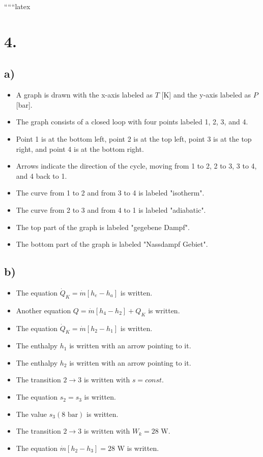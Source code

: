 
``````latex


\section*{4.}

\subsection*{a)}

\begin{itemize}
    \item A graph is drawn with the x-axis labeled as $T$ [K] and the y-axis labeled as $P$ [bar].
    \item The graph consists of a closed loop with four points labeled 1, 2, 3, and 4.
    \item Point 1 is at the bottom left, point 2 is at the top left, point 3 is at the top right, and point 4 is at the bottom right.
    \item Arrows indicate the direction of the cycle, moving from 1 to 2, 2 to 3, 3 to 4, and 4 back to 1.
    \item The curve from 1 to 2 and from 3 to 4 is labeled "isotherm".
    \item The curve from 2 to 3 and from 4 to 1 is labeled "adiabatic".
    \item The top part of the graph is labeled "gegebene Dampf".
    \item The bottom part of the graph is labeled "Nassdampf Gebiet".
\end{itemize}

\subsection*{b)}

\begin{itemize}
    \item The equation $\dot{Q}_K = \dot{m} \left[ h_e - h_a \right]$ is written.
    \item Another equation $Q = \dot{m} \left[ h_4 - h_2 \right] + Q_K$ is written.
    \item The equation $\dot{Q}_K = \dot{m} \left[ h_2 - h_1 \right]$ is written.
    \item The enthalpy $h_1$ is written with an arrow pointing to it.
    \item The enthalpy $h_2$ is written with an arrow pointing to it.
    \item The transition $2 \rightarrow 3$ is written with $s = const$.
    \item The equation $s_2 = s_3$ is written.
    \item The value $s_3 (8 \text{ bar})$ is written.
    \item The transition $2 \rightarrow 3$ is written with $W_k = 28 \text{ W}$.
    \item The equation $\dot{m} \left[ h_2 - h_3 \right] = 28 \text{ W}$ is written.
\end{itemize}

